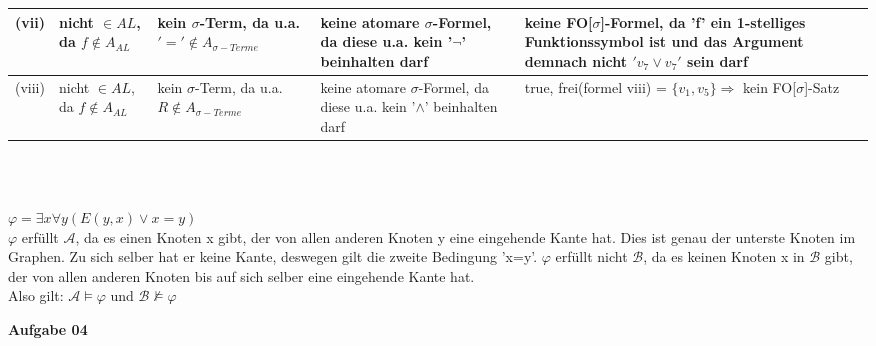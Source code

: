 \documentclass[a4paper,10pt]{article}
\begin{document}
\begin{compactenum} [(a)]
\begin{tabular}  {c|L{3cm}|L{3cm}|L{4cm}|L{4cm}}
			(vii) & nicht $ \in AL $, da $ f \not\in A_{AL} $& kein $ \sigma $-Term, da u.a. $ '= ' \not\in A_{\sigma -Terme}$ &keine atomare $ \sigma $-Formel, da diese u.a. kein '$ \lnot $' beinhalten darf& keine FO[$ \sigma $]-Formel, da 'f' ein 1-stelliges Funktionssymbol ist und das Argument demnach nicht $ 'v_7 \vee v_7' $ sein darf\\ \hline
			
			(viii) & nicht $ \in AL $, da $ f \not\in A_{AL} $& kein $ \sigma $-Term, da u.a. $ R \not\in A_{\sigma -Terme}$ &keine atomare $ \sigma $-Formel, da diese u.a. kein '$ \wedge $' beinhalten darf& true, frei(formel viii) = $ \{v_1,v_5\} \Longrightarrow$ kein FO[$ \sigma $]-Satz \\ \hline
		\end{tabular} \\\\
		
		
		\item $ \varphi = \exists x \forall y (E(y,x)\vee x=y)$\\
		$ \varphi $ erfüllt $ \mathcal{A} $, da es einen Knoten x gibt, der von allen anderen Knoten y eine eingehende Kante hat. Dies ist genau der unterste Knoten im Graphen. Zu sich selber hat er keine Kante, deswegen gilt die zweite Bedingung 'x=y'. $ \varphi $ erfüllt nicht $ \mathcal{B} $, da es keinen Knoten x in $ \mathcal{B} $ gibt, der von allen anderen Knoten bis auf sich selber eine eingehende Kante hat.\\
		Also gilt: $ \mathcal{A} \models \varphi $ und $ \mathcal{B} \not\models \varphi$
	\end{compactenum}
	\newpage

	\textbf{Aufgabe 04}\\
\end{document}

